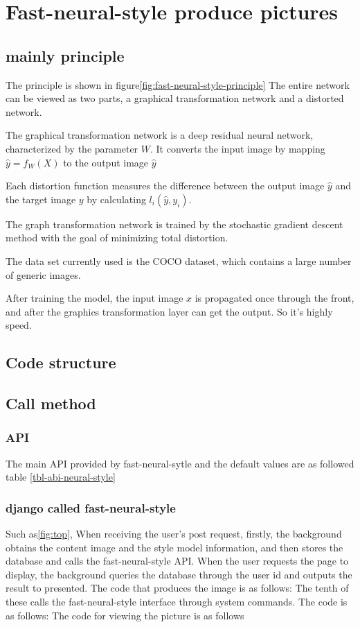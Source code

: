 \section{Fast-neural-style produce pictures}
\subsection{mainly principle}
The principle is shown in figure\ref{fig:fast-neural-style-principle}
The entire network can be viewed as two parts, a graphical transformation network and a distorted network.

The graphical transformation network is a deep residual neural network, characterized by the parameter $W$. It converts the input image by mapping $\hat y=f_W(X)$ to the output image $\hat y$

Each distortion function measures the difference between the output image $\hat y$ and the target image $y$ by calculating $l_i(\hat y,y_i)$.

The graph transformation network is trained by the stochastic gradient descent method with the goal of minimizing total distortion.

The data set currently used is the COCO dataset, which contains a large number of generic images.

After training the model, the input image $x$ is propagated once through the front, and after the graphics transformation layer can get the output. So it's highly speed.
\subsection{Code structure}

\subsection{Call method}

\subsubsection{API}
The main API provided by fast-neural-sytle and the default values are as followed table \ref{tbl-abi-neural-style}
\subsubsection{django called fast-neural-style}
Such as\ref{fig:top}, When receiving the user's post request, firstly, the background obtains the content image and the style model information, and then stores the database and calls the fast-neural-style API. When the user requests the page to display, the background queries the database through the user id and outputs the result to presented.
The code that produces the image is as follows:
The tenth of these calls the fast-neural-style interface through system commands. The code is as follows:
The code for viewing the picture is as follows
